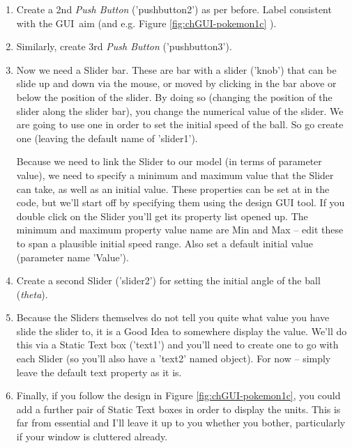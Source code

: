 \documentclass{tufte-book} %
\begin{document}
\begin{enumerate}
\item Create a 2nd \textit{Push Button} ('\textsf{pushbutton}2') as per before. Label consistent with the GUI\ aim (and e.g. Figure \ref{fig:chGUI-pokemon1c} ).

\item Similarly, create 3rd \textit{Push Button} ('\textsf{pushbutton}3').

\item Now we need a \textsf{Slider} bar. These are bar with a slider ('knob') that can be slide up and down via the mouse, or moved by clicking in the bar above or below the position of the slider. By doing so (changing the position of the slider along the slider bar), you change the numerical value of the slider. We are going to use one in order to set the initial speed of the ball. So go create one (leaving the default name of '\textsf{slider1}').

Because we need to link the \textsf{Slider} to our model (in terms of parameter value), we need to specify a minimum and maximum value that the \textsf{Slider} can take, as well as an initial value. These properties can be set at in the code, but we'll start off by specifying them using the design GUI tool. If you double click on the \textsf{Slider} you'll get its property list opened up. The minimum and maximum property value name are \textsf{Min} and \textsf{Max} -- edit these to span a plausible initial speed range. Also set a default initial value (parameter name '\textsf{Value}').

\item Create a second \textsf{Slider} ('\textsf{slider2}') for setting the initial angle of the ball (\textit{theta}).

\item Because the \textsf{Sliders} themselves do not tell you quite what value you have slide the slider to, it is a Good Idea to somewhere display the value. We'll do this via a \textsf{Static Text} box ('\textsf{text1}') and you'll need to create one to go with each \textsf{Slider} (so you'll also have a '\textsf{text2}' named object). For now -- simply leave the default text property as it is.

\item Finally, if you follow the design in Figure \ref{fig:chGUI-pokemon1c}, you could add a further pair of \textsf{Static Text} boxes in order to display the units. This is far from essential and I'll leave it up to you whether you bother, particularly if your window is cluttered already. 

\end{enumerate}
\end{document}
